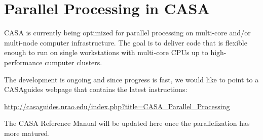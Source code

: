 
\chapter{Parallel Processing in CASA}
\label{chapter:parallel}


CASA is currently being optimized for parallel processing on
multi-core and/or multi-node computer infrastructure. The goal is to
deliver code that is flexible enough to run on single workstations
with multi-core CPUs up to high-performance cumputer clusters. 

The development is ongoing and since progress is fast, we would like
to point to a CASAguides webpage that contains the latest instructions: 

\url{http://casaguides.nrao.edu/index.php?title=CASA_Parallel_Processing}

The CASA Reference Manual will be updated here once the parallelization has
more matured.
